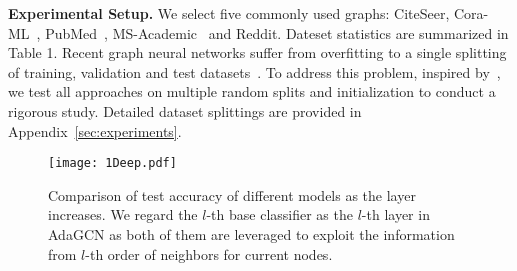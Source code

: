 \documentclass{article} \usepackage{iclr2021_conference,times}
\begin{document}
\begin{table}[b!]
\label{table:dataset}
	\centering
	\caption{Dateset statistics}
\end{table}

\textbf{Experimental Setup.} We select five commonly used graphs: CiteSeer, Cora-ML~\citep{bojchevski2017deep,mccallum2000automating}, PubMed~\citep{sen2008collective}, MS-Academic~\citep{shchur2018pitfalls} and Reddit. Dateset statistics are summarized in Table 1. Recent graph neural networks suffer from overfitting to a single splitting of training, validation and test datasets~\citep{klicpera2018predict}. To address this problem, inspired by~\citep{klicpera2018predict}, we test all approaches on multiple random splits and initialization to conduct a rigorous study. Detailed dataset splittings are provided in Appendix~\ref{sec:experiments}.



\begin{figure}[t!]
	\centering
	\texttt{[image: 1Deep.pdf]}
	\caption{Comparison of test accuracy of different models as the layer increases. We regard the $l$-th base classifier as the $l$-th layer in AdaGCN as both of them are leveraged to exploit the information from $l$-th order of neighbors for current nodes.}
	\label{figure_deep}
\end{figure}
\end{document}
